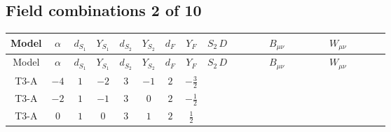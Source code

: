 \documentclass[8pt]{article}
\begin{document}
\begin{landscape}
\subsection*{Field combinations 2 of 10}
\begin{longtable}{@{}cccccccc >{\raggedright\arraybackslash}p{0.21\linewidth} >{\raggedright\arraybackslash}p{0.21\linewidth} >{\raggedright\arraybackslash}p{0.21\linewidth}@{}}
\toprule
Model & $\alpha$ & $d_{S_1}$ & $Y_{S_1}$ & $d_{S_2}$ & $Y_{S_2}$ & $d_F$ & $Y_F$ & $S_2\,D$ & $B_{\mu\nu}$ & $W_{\mu\nu}$ \\
\midrule
\endfirsthead
\toprule
Model & $\alpha$ & $d_{S_1}$ & $Y_{S_1}$ & $d_{S_2}$ & $Y_{S_2}$ & $d_F$ & $Y_F$ & $S_2\,D$ & $B_{\mu\nu}$ & $W_{\mu\nu}$ \\
\midrule
\endhead
T3-A & $-4$ & $1$ & $-2$ & $3$ & $-1$ & $2$ & $-\frac{3}{2}$ & \scriptsize\adjustbox{max width=\linewidth}{$\begin{gathered} +D_{\mu _1}\left(S_{2,j_1}\right){}^{\dagger } D_{\mu _1}\left(S_{2,j_1}\right)\end{gathered}$} & \scriptsize\adjustbox{max width=\linewidth}{$\begin{gathered} -\frac{9 \hbar  B_{\mu _1\mu _2}^2}{2 \epsilon }\end{gathered}$} & \scriptsize\adjustbox{max width=\linewidth}{$\begin{gathered} -\frac{\hbar  \left(W_{\mu _1\mu _2}^{A_1}\right){}^2}{2 \epsilon }\end{gathered}$} \\
\midrule
T3-A & $-2$ & $1$ & $-1$ & $3$ & $0$ & $2$ & $-\frac{1}{2}$ & \scriptsize\adjustbox{max width=\linewidth}{$\begin{gathered} +D_{\mu _1}\left(S_{2,j_1}\right){}^{\dagger } D_{\mu _1}\left(S_{2,j_1}\right)\end{gathered}$} & \scriptsize\adjustbox{max width=\linewidth}{$\begin{gathered} -\frac{\hbar  B_{\mu _1\mu _2}^2}{2 \epsilon }\end{gathered}$} & \scriptsize\adjustbox{max width=\linewidth}{$\begin{gathered} -\frac{\hbar  \left(W_{\mu _1\mu _2}^{A_1}\right){}^2}{2 \epsilon }\end{gathered}$} \\
\midrule
T3-A & $0$ & $1$ & $0$ & $3$ & $1$ & $2$ & $\frac{1}{2}$ & \scriptsize\adjustbox{max width=\linewidth}{$\begin{gathered} +D_{\mu _1}\left(S_{2,j_1}\right){}^{\dagger } D_{\mu _1}\left(S_{2,j_1}\right)\end{gathered}$} & \scriptsize\adjustbox{max width=\linewidth}{$\begin{gathered} -\frac{\hbar  B_{\mu _1\mu _2}^2}{2 \epsilon }\end{gathered}$} & \scriptsize\adjustbox{max width=\linewidth}{$\begin{gathered} -\frac{\hbar  \left(W_{\mu _1\mu _2}^{A_1}\right){}^2}{2 \epsilon }\end{gathered}$} \\

\end{longtable}
\end{landscape}
\end{document}
